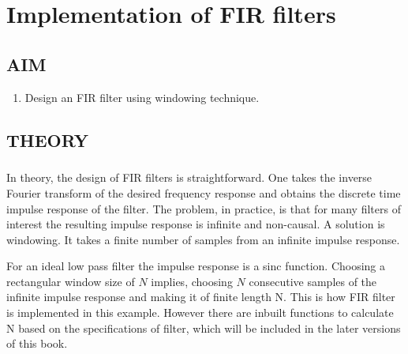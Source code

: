 \chapter [Implementation of FIR filters]{Implementation of FIR filters}


\section{AIM}

\begin{enumerate}
\item

Design an FIR filter using windowing technique.

\end{enumerate}
\section{THEORY}
\paragraph{}

In theory, the design of FIR filters is straightforward. One takes the inverse Fourier transform of the desired frequency response and obtains the discrete time impulse response of the filter. The problem, in practice, is that for many filters of interest the resulting impulse response is infinite and non-causal. A solution is windowing. It takes a finite number of samples from an infinite impulse response.

For an ideal low pass filter the impulse response is a sinc function.  Choosing a rectangular window size of $N$ implies, choosing $N$ consecutive samples of the infinite impulse response and making it of finite length N. This is how FIR filter is implemented in this example. However there are inbuilt functions to calculate N based on the specifications of filter, which will be included in the later versions of this book.


%
%

